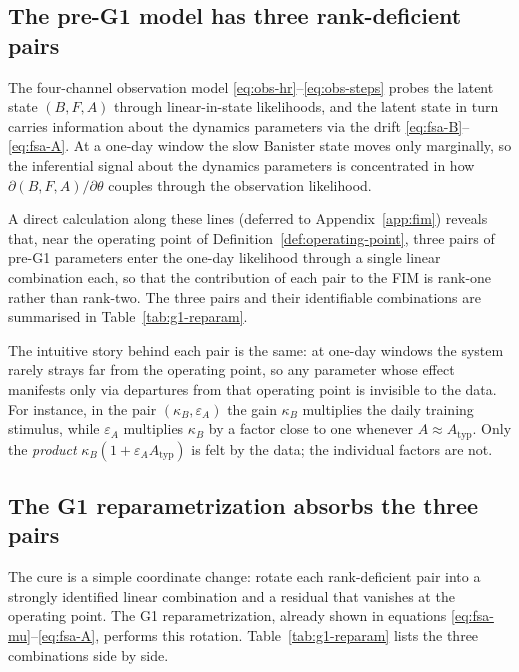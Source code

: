 \subsection{The pre-G1 model has three rank-deficient pairs}\label{sec:fim-deficient}

The four-channel observation model
\eqref{eq:obs-hr}--\eqref{eq:obs-steps} probes the latent state
$(B,F,A)$ through linear-in-state likelihoods, and the latent state
in turn carries information about the dynamics parameters via the
drift \eqref{eq:fsa-B}--\eqref{eq:fsa-A}. At a one-day window the
slow Banister state moves only marginally, so the inferential signal
about the dynamics parameters is concentrated in how
$\partial(B,F,A)/\partial\theta$ couples through the observation
likelihood.

A direct calculation along these lines (deferred to
Appendix~\ref{app:fim}) reveals that, near the operating point of
Definition~\ref{def:operating-point}, three pairs of pre-G1 parameters
enter the one-day likelihood through a single linear combination
each, so that the contribution of each pair to the FIM is rank-one
rather than rank-two. The three pairs and their identifiable
combinations are summarised in Table~\ref{tab:g1-reparam}.

The intuitive story behind each pair is the same: at one-day windows
the system rarely strays far from the operating point, so any
parameter whose effect manifests only via departures from that
operating point is invisible to the data. For instance, in the pair
$(\kappa_B, \varepsilon_A)$ the gain $\kappa_B$ multiplies the daily
training stimulus, while $\varepsilon_A$ multiplies $\kappa_B$ by a
factor close to one whenever $A \approx A_{\mathrm{typ}}$. Only the
\emph{product} $\kappa_B(1+\varepsilon_A A_{\mathrm{typ}})$ is felt by
the data; the individual factors are not.

\subsection{The G1 reparametrization absorbs the three pairs}\label{sec:fim-g1}

The cure is a simple coordinate change: rotate each rank-deficient
pair into a strongly identified linear combination and a residual
that vanishes at the operating point. The G1 reparametrization,
already shown in equations \eqref{eq:fsa-mu}--\eqref{eq:fsa-A},
performs this rotation. Table~\ref{tab:g1-reparam} lists the three
combinations side by side.

